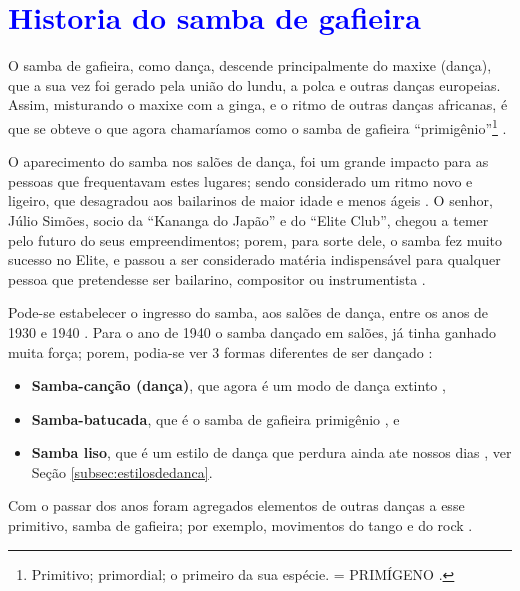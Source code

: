

\chapter{\textcolor{blue}{Historia do samba de gafieira}}


O samba de gafieira, como dança, descende principalmente do maxixe (dança),
que a sua vez foi gerado  pela união do  lundu, 
a polca e outras danças europeias.
Assim, misturando o maxixe com a ginga, e o ritmo de outras danças africanas, 
é que se obteve o que agora chamaríamos como o samba de gafieira ``primigênio''\footnote{
Primitivo; primordial; o primeiro da sua espécie. = PRIMÍGENO \cite{priberamprimigenio}.
} \cite[pp. 139]{perna2002samba}.


O aparecimento do samba nos salões de dança, 
foi um grande impacto para as pessoas que frequentavam estes lugares;
sendo considerado um ritmo novo e ligeiro,
que desagradou aos bailarinos de maior idade e menos ágeis \cite[pp. 3]{entrevistajuliojournalbrasil1}.
O senhor, Júlio Simões, socio da ``Kananga do Japão'' e
do ``Elite Club'', chegou a temer pelo futuro do seus empreendimentos; porem, para sorte dele, 
o samba fez muito sucesso no Elite,
e passou a ser considerado matéria indispensável para qualquer pessoa que pretendesse ser bailarino, 
compositor ou instrumentista \cite[pp. 3]{entrevistajuliojournalbrasil1}.

Pode-se estabelecer o ingresso do samba, aos salões de dança, entre os anos de 1930 e 1940 \cite[pp. 140]{perna2002samba}.
Para o ano de 1940 o samba dançado em salões, já tinha ganhado muita força;
porem, podia-se ver 3 formas diferentes de ser dançado \cite[pp. 142-143]{perna2002samba}:
\begin{itemize}
\item \textbf{Samba-canção (dança)}, que agora é um modo de dança extinto \cite[pp. 143]{perna2002samba},
\item \textbf{Samba-batucada}, que é o samba de gafieira primigênio \cite[pp. 143]{perna2002samba}, e
\item \textbf{Samba liso}, que é um estilo de dança que perdura ainda ate nossos dias \cite[pp. 143]{perna2002samba}, ver Seção \ref{subsec:estilosdedanca}.
\end{itemize}
Com o passar dos anos foram agregados elementos de outras danças a esse primitivo, samba de gafieira;
por exemplo, movimentos do tango e do rock \cite[pp. 142]{perna2002samba}.

